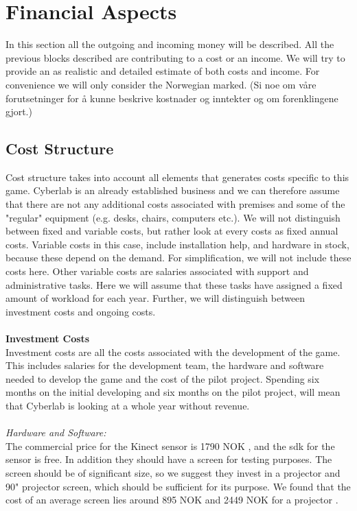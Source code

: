 \section{Financial Aspects}
In this section all the outgoing and incoming money will be described. All the previous blocks described are contributing to a cost or an income. We will try to provide an as realistic and detailed estimate of both costs and income. For convenience we will only consider the Norwegian marked.  (Si noe om v{å}re forutsetninger for {å} kunne beskrive kostnader og inntekter og om forenklingene gjort.)


\subsection{Cost Structure}
Cost structure takes into account all elements that generates costs specific to this game. Cyberlab is an already established business and we can therefore assume that there are not any additional costs associated with premises and some of the "regular" equipment (e.g. desks, chairs, computers etc.). We will not distinguish between fixed and variable costs, but rather look at every costs as fixed annual costs. Variable costs in this case, include installation help, and hardware in stock, because these depend on the demand. For simplification, we will not include these costs here. Other variable costs are salaries associated with support and administrative tasks. Here we will assume that these tasks have assigned a fixed amount of workload for each year. Further, we will distinguish between investment costs and ongoing costs.  \\ \\
\textbf{Investment Costs}\\
Investment costs are all the costs associated with the development of the game. This includes salaries for the development team, the hardware and software needed to develop the game and the cost of the pilot project.  Spending six months on the initial developing and six months on the pilot project, will mean that Cyberlab is looking at a whole year without revenue.\\ \\
\emph{Hardware and Software:}\\
The commercial price for the Kinect sensor is 1790 NOK \cite{pricekinect}, and the \ac{sdk} for the sensor is free. In addition they should have a screen for testing purposes. The screen should be of significant size, so we suggest they invest in a projector and 90" projector screen, which should be sufficient for its purpose. We found that the cost of an average screen lies around 895 NOK and 2449 NOK for a projector \cite{priceprojector}\cite{pricescreen}.\\ \\
